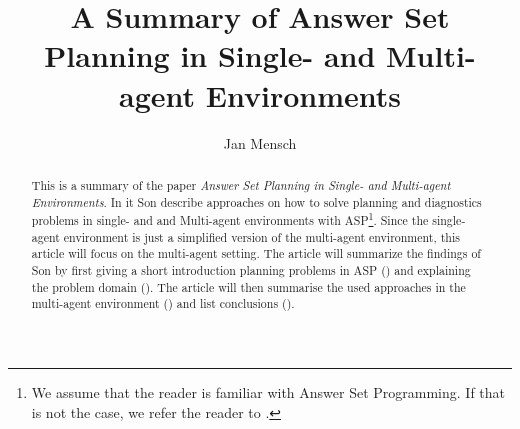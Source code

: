 \documentclass[runningheads]{llncs}
\newcommand{\papertitle}{Answer Set Planning in Single- and Multi-agent Environments}
\newcommand{\authorquote}{Son \etal}
\begin{document}
\title{A Summary of \papertitle}

\author{Jan Mensch}




%
\maketitle              %


\begin{abstract}
This is a summary of the paper \textit{\papertitle}. In it \authorquote{} describe approaches on how to solve planning and diagnostics problems in single- and and Multi-agent environments with ASP\footnote{We assume that the reader is familiar with Answer Set Programming. If that is not the case, we refer the reader to \cite{erdem2016applications}.}. Since the single-agent environment is just a simplified version of the multi-agent environment, this article will focus on the multi-agent setting. The article will summarize the findings of \authorquote{} by first giving a  short introduction planning problems in ASP () and explaining the problem domain (). The article will then summarise the used approaches in the multi-agent environment () and list conclusions ().

\end{abstract}


\end{document}
